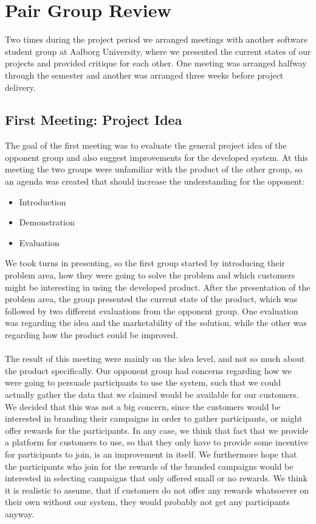\section{Pair Group Review}
\label{sec:pair_group_review}

Two times during the project period we arranged meetings with another software student group at Aalborg University, where we presented the current states of our projects and provided critique for each other. One meeting was arranged halfway through the semester and another was arranged three weeks before project delivery. 

\subsection{First Meeting: Project Idea}
\label{sub:first_meeting_project_idea}
The goal of the first meeting was to evaluate the general project idea of the opponent group and also suggest improvements for the developed system. At this meeting the two groups were unfamiliar with the product of the other group, so an agenda was created that should increase the understanding for the opponent:

\begin{itemize}
    \item Introduction
    \item Demonstration
    \item Evaluation
\end{itemize}

We took turns in presenting, so the first group started by introducing their problem area, how they were going to solve the problem and which customers might be interesting in using the developed product. After the presentation of the problem area, the group presented the current state of the product, which was followed by two different evaluations from the opponent group. One evaluation was regarding the idea and the marketability of the solution, while the other was regarding how the product could be improved. 
\\\\
The result of this meeting were mainly on the idea level, and not so much about the product specifically. Our opponent group had concerns regarding how we were going to persuade participants to use the system, such that we could actually gather the data that we claimed would be available for our customers. We decided that this was not a big concern, since the customers would be interested in branding their campaigns in order to gather participants, or might offer rewards for the participants. In any case, we think that fact that we provide a platform for customers to use, so that they only have to provide some incentive for participants to join, is an improvement in itself. We furthermore hope that the participants who join for the rewards of the branded campaigns would be interested in selecting campaigns that only offered small or no rewards. We think it is realistic to assume, that if customers do not offer any rewards whatsoever on their own without our system, they would probably not get any participants anyway. 

